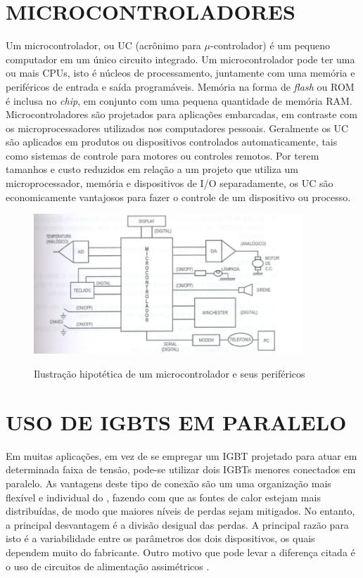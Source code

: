 \section{MICROCONTROLADORES}
\label{sec:micro}

Um microcontrolador, ou UC (acrônimo para   $\mu$-controlador) é um pequeno computador em um único circuito integrado. Um microcontrolador pode ter uma ou mais CPUs, isto é núcleos de processamento, juntamente com uma memória e periféricos de entrada e saída programáveis. Memória na forma de \textit{flash} ou ROM é inclusa no \textit{chip}, em conjunto com uma pequena quantidade de memória RAM. Microcontroladores são projetados para aplicações embarcadas, em contraste com os microprocessadores utilizados nos computadores pessoais. Geralmente os UC são aplicados em produtos ou dispositivos controlados automaticamente, tais como sistemas de controle para motores ou controles remotos. Por terem tamanhos e custo reduzidos em relação a um projeto que utiliza um microprocessador, memória e dispositivos de I/O separadamente, os UC são economicamente vantajosos para fazer o controle de um dispositivo ou processo.


\begin{figure}[!htb]
    \centering
    \caption{Ilustração hipotética de um microcontrolador e seus periféricos}
    \includegraphics[width=0.9\textwidth]{./dados/figuras/micro}
    \label{fig:figura-uc}
\end{figure}

\pagebreak 

\section{USO DE IGBTS EM PARALELO}
\label{sec:paralleligbt}

Em muitas aplicações, em vez de se empregar um IGBT projetado para atuar em determinada faixa de tensão, pode-se utilizar dois IGBTs menores conectados em paralelo. As vantagens deste tipo de conexão são um uma organização mais flexível e individual do , fazendo com que as fontes de calor estejam mais distribuídas, de modo que maiores níveis de perdas sejam mitigados. No entanto, a principal desvantagem é a divisão desigual das perdas. A principal razão para isto é a variabilidade entre os parâmetros dos dois dispositivos, os quais dependem muito do fabricante. Outro motivo que pode levar a diferença citada é o uso de circuitos de alimentação assimétricos \cite{Infineon}.
            
